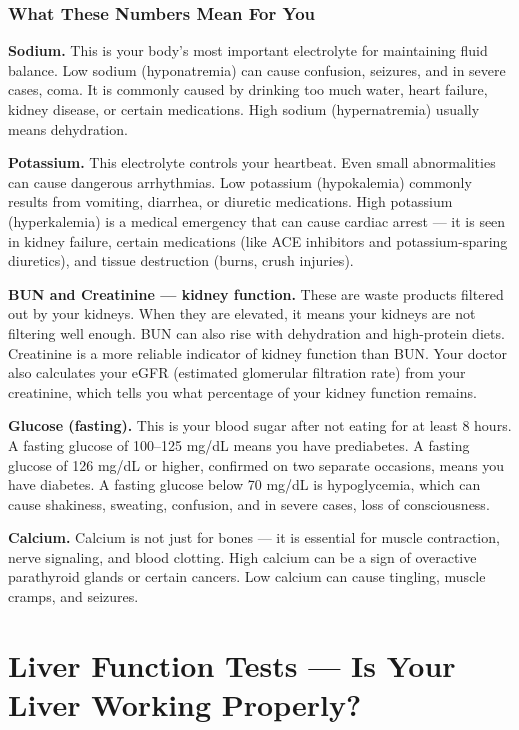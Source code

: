 \subsubsection{What These Numbers Mean For You}

\textbf{Sodium.} This is your body's most important electrolyte for maintaining fluid balance. Low sodium (hyponatremia) can cause confusion, seizures, and in severe cases, coma. It is commonly caused by drinking too much water, heart failure, kidney disease, or certain medications. High sodium (hypernatremia) usually means dehydration.

\textbf{Potassium.} This electrolyte controls your heartbeat. Even small abnormalities can cause dangerous arrhythmias. Low potassium (hypokalemia) commonly results from vomiting, diarrhea, or diuretic medications. High potassium (hyperkalemia) is a medical emergency that can cause cardiac arrest --- it is seen in kidney failure, certain medications (like ACE inhibitors and potassium-sparing diuretics), and tissue destruction (burns, crush injuries).

\textbf{BUN and Creatinine --- kidney function.} These are waste products filtered out by your kidneys. When they are elevated, it means your kidneys are not filtering well enough. BUN can also rise with dehydration and high-protein diets. Creatinine is a more reliable indicator of kidney function than BUN. Your doctor also calculates your eGFR (estimated glomerular filtration rate) from your creatinine, which tells you what percentage of your kidney function remains.

\textbf{Glucose (fasting).} This is your blood sugar after not eating for at least 8 hours. A fasting glucose of 100--125 mg/dL means you have prediabetes. A fasting glucose of 126 mg/dL or higher, confirmed on two separate occasions, means you have diabetes. A fasting glucose below 70 mg/dL is hypoglycemia, which can cause shakiness, sweating, confusion, and in severe cases, loss of consciousness.

\textbf{Calcium.} Calcium is not just for bones --- it is essential for muscle contraction, nerve signaling, and blood clotting. High calcium can be a sign of overactive parathyroid glands or certain cancers. Low calcium can cause tingling, muscle cramps, and seizures.

\clearpage
\section{Liver Function Tests --- Is Your Liver Working Properly?}

